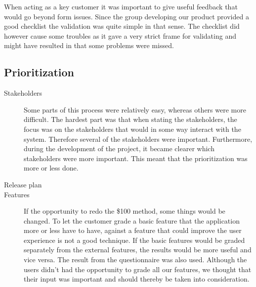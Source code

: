 \documentclass[10pt,a4paper]{article}
\begin{document}
When acting as a key customer it was important to give useful feedback that would go beyond form issues. Since the group developing our product provided a good checklist the validation was quite simple in that sense. The checklist did however cause some troubles as it gave a very strict frame for validating and might have resulted in that some problems were missed.


\subsection{Prioritization}
\begin{description}
\item[Stakeholders] Some parts of this process were relatively easy, whereas others were more difficult. The hardest part was that when stating the stakeholders, the focus was on the stakeholders that would in some way interact with the system. Therefore several of the stakeholders were important. Furthermore, during the development of the project, it became clearer which stakeholders were more important. This meant that the prioritization was more or less done.

\item[Release plan]

\item[Features] If the opportunity to redo the \$100 method, some things would be changed. To let the customer grade a basic feature that the application more or less have to have, against a feature that could improve the user experience is not a good technique. If the basic features would be graded separately from the external features, the results would be more useful and vice versa. 
The result from the questionnaire was also used. Although the users didn't had the opportunity to grade all our features, we thought that their input was important and should thereby be taken into consideration. 

\end{description}
\end{document}
